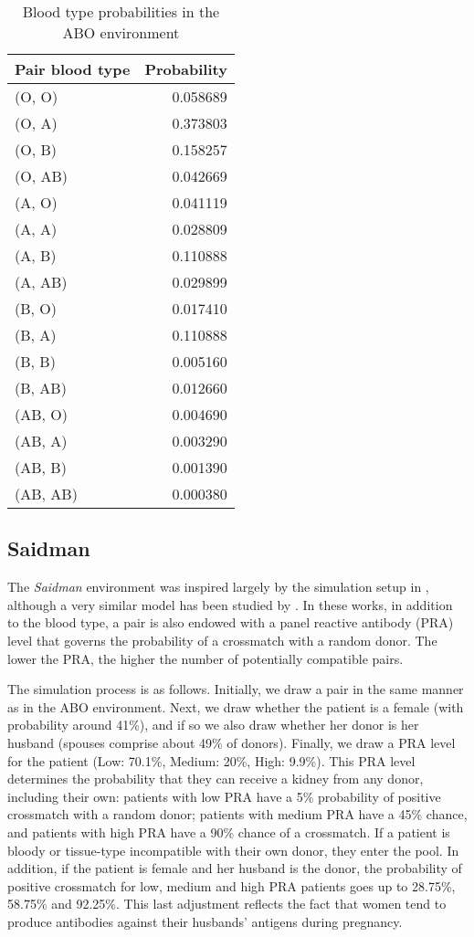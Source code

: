 \documentclass[12pt]{article}
\begin{document}
\begin{table}[htdp]
\centering
\begin{tabular}{lr}
\toprule
Pair blood type &         Probability \\
\midrule
(O, O) &  0.058689 \\
(O, A) &  0.373803 \\
(O, B) &  0.158257 \\
(O, AB) &  0.042669 \\
(A, O) &  0.041119 \\
(A, A) &  0.028809 \\
(A, B) &  0.110888 \\
(A, AB) &  0.029899 \\
(B, O) &  0.017410 \\
(B, A) &  0.110888 \\
(B, B) &  0.005160 \\
(B, AB) &  0.012660 \\
(AB, O) &  0.004690 \\
(AB, A) &  0.003290 \\
(AB, B) &  0.001390 \\
(AB, AB) &  0.000380 \\
\bottomrule
\end{tabular}
\caption{Blood type probabilities in the ABO environment}
\label{tab:abo_blood_type}
\end{table}

\subsection{Saidman}

The \emph{Saidman} environment was inspired largely by the simulation setup in \cite{saidman2006increasing}, although a very similar model has been studied by \cite{toulis2011random}. In these works, in addition to the blood type, a pair is also endowed with a panel reactive antibody (PRA) level that governs the probability of a crossmatch with a random donor. The lower the PRA, the higher the number of potentially compatible pairs.

The simulation process is as follows. Initially, we draw a pair in the same manner as in the ABO environment. Next, we draw whether the patient is a female (with probability around 41\%), and if so we also draw whether her donor is her husband (spouses comprise about 49\% of donors). Finally, we draw a PRA level for the patient (Low: 70.1\%, Medium: 20\%, High: 9.9\%). This PRA level determines the probability that they can receive a kidney from any donor, including their own: patients with low PRA have a 5\% probability of positive crossmatch with a random donor; patients with medium PRA have a 45\% chance, and patients with high PRA have a 90\% chance of a crossmatch. If a patient is bloody or tissue-type incompatible with their own donor, they enter the pool. In addition, if the patient is female and her husband is the donor, the probability of positive crossmatch for low, medium and high PRA patients goes up to 28.75\%, 58.75\% and 92.25\%. This last adjustment reflects the fact that women tend to produce antibodies against their husbands' antigens during pregnancy.
\end{document}
